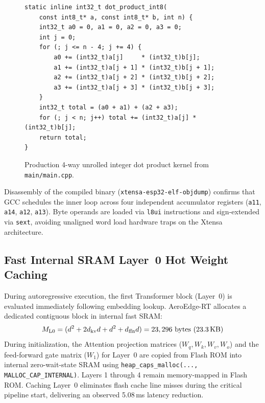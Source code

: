 \documentclass[10pt,a4paper]{article}
\begin{document}
\begin{figure}[h]
\begin{minipage}{0.98\columnwidth}
\begin{verbatim}
static inline int32_t dot_product_int8(
    const int8_t* a, const int8_t* b, int n) {
    int32_t a0 = 0, a1 = 0, a2 = 0, a3 = 0;
    int j = 0;
    for (; j <= n - 4; j += 4) {
        a0 += (int32_t)a[j]     * (int32_t)b[j];
        a1 += (int32_t)a[j + 1] * (int32_t)b[j + 1];
        a2 += (int32_t)a[j + 2] * (int32_t)b[j + 2];
        a3 += (int32_t)a[j + 3] * (int32_t)b[j + 3];
    }
    int32_t total = (a0 + a1) + (a2 + a3);
    for (; j < n; j++) total += (int32_t)a[j] * (int32_t)b[j];
    return total;
}
\end{verbatim}
\end{minipage}
\caption{Production 4-way unrolled integer dot product kernel from \texttt{main/main.cpp}.}
\label{fig:code_kernel}
\end{figure}

Disassembly of the compiled binary (\texttt{xtensa-esp32-elf-objdump}) confirms that GCC schedules the inner loop across four independent accumulator registers (\texttt{a11}, \texttt{a14}, \texttt{a12}, \texttt{a13}). Byte operands are loaded via \texttt{l8ui} instructions and sign-extended via \texttt{sext}, avoiding unaligned word load hardware traps on the Xtensa architecture.

\subsection{Fast Internal SRAM Layer~0 Hot Weight Caching}
During autoregressive execution, the first Transformer block (Layer~0) is evaluated immediately following embedding lookup. AeroEdge-RT allocates a dedicated contiguous block in internal fast SRAM:
\begin{equation}
    M_{\text{L0}} = (d^2 + 2 d_{\text{kv}} d + d^2 + d_{\text{ffn}} d) = 23,296\text{ bytes (23.3\,KB)}
\end{equation}
During initialization, the Attention projection matrices ($W_q, W_k, W_v, W_o$) and the feed-forward gate matrix ($W_1$) for Layer~0 are copied from Flash ROM into internal zero-wait-state SRAM using \texttt{heap\_caps\_malloc(..., MALLOC\_CAP\_INTERNAL)}. Layers 1 through 4 remain memory-mapped in Flash ROM. Caching Layer~0 eliminates flash cache line misses during the critical pipeline start, delivering an observed 5.08\,ms latency reduction.
\end{document}
